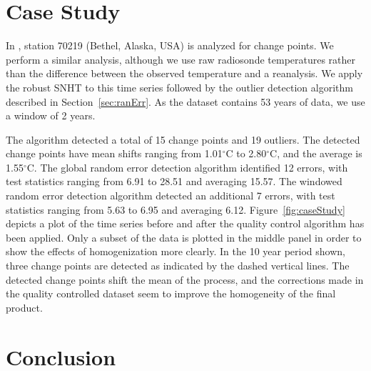 \documentclass[12pt]{article}
\begin{document}
\begin{doublespacing}

\section{Case Study}

In \cite{haimberger07}, station 70219 (Bethel, Alaska, USA) is analyzed for change points.  We perform a similar analysis, although we use raw radiosonde temperatures rather than the difference between the observed temperature  and a reanalysis.  We apply the robust SNHT to this time series followed by the outlier detection algorithm described in Section~\ref{sec:ranErr}.  As the dataset contains 53 years of data, we use a window of 2 years.

The algorithm detected a total of 15 change points and 19 outliers.  The detected change points have mean shifts ranging from 1.01$^\circ$C to 2.80$^\circ$C, and the average is 1.55$^\circ$C.  The global random error detection algorithm identified 12 errors, with test statistics ranging from 6.91 to 28.51 and averaging 15.57.  The windowed random error detection algorithm detected an additional 7 errors, with test statistics ranging from 5.63 to 6.95 and averaging 6.12. Figure~\ref{fig:caseStudy} depicts a plot of the time series before and after the quality control algorithm has been applied.  Only a subset of the data is plotted in the middle panel in order to show the effects of homogenization more clearly.  In the 10 year period shown, three change points are detected as indicated by the dashed vertical lines.  The detected change points shift the mean of the process, and the corrections made in the quality controlled dataset seem to improve the homogeneity of the final product.

\section{Conclusion}


\end{doublespacing}
\end{document}
